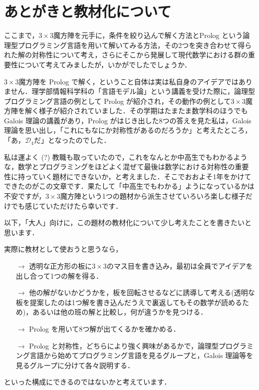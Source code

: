 \documentclass[11pt]{jsarticle}
\begin{document}
\section{あとがきと教材化について}
ここまで，$3\times 3$魔方陣を元手に，条件を絞り込んで解く方法とProlog という論理型プログラミング言語を用いて解いてみる方法，その2つを突き合わせて得られた解の対称性について考え，さらにそこから発展して現代数学における群の重要性について考えてみましたが，いかがでしたでしょうか．

$3\times 3$魔方陣を Prolog で解く，ということ自体は実は私自身のアイデアではありません．理学部情報科学科の「言語モデル論」という講義を受けた際に，論理型プログラミング言語の例として Prolog が紹介され，その動作の例として$3\times 3$魔方陣を解く様子が紹介されていました．その学期はたまたま数学科のほうでも Galois 理論の講義があり，Prolog がはじき出した8つの答えを見た私は，Galois 理論を思い出し，「これにもなにか対称性があるのだろうか」と考えたところ，「あ，$\mathcal{D}_4$だ」となったのでした．

私は運よく (?) 教職も取っていたので，これをなんとか中高生でもわかるような，数学とプログラミングをほどよく混ぜて最後は数学における対称性の重要性に持っていく題材にできないか，と考えました．そこでおおよそ1年をかけてできたのがこの文章です．果たして「中高生でもわかる」ようになっているかは不安ですが，$3\times 3$魔方陣という1つの題材から派生させていろいろ楽しむ様子だけでも感じていただけたら幸いです．

以下，「大人」向けに，この題材の教材化について少し考えたことを書きたいと思います．

実際に教材として使おうと思うなら，
\begin{itemize}
\item[$\rightarrow$] 透明な正方形の板に$3\times 3$のマス目を書き込み，最初は全員でアイデアを出し合って1つの解を得る．

\item[$\rightarrow$] 他の解がないかどうかを，板を回転させるなどに誘導して考える(透明な板を提案したのは1つ解を書き込んだうえで裏返してもその数学が読めるため)，あるいは他の班の解と比較し，何が違うかを見つける．

\item[$\rightarrow$] Prolog を用いて8つ解が出てくるかを確かめる．

\item[$\rightarrow$] Prolog と対称性，どちらにより強く興味があるかで，論理型プログラミング言語から始めてプログラミング言語を見るグループと，Galois 理論等を見るグループに分けて各々説明する．
\end{itemize}
といった構成にできるのではないかと考えています．
\end{document}
